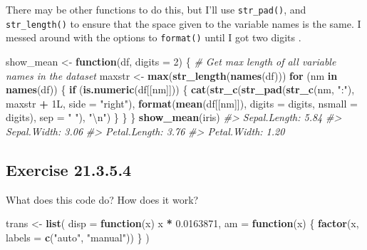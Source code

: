 \documentclass[]{book}
\newenvironment{Shaded}{\begin{snugshade}}{\end{snugshade}}
\newcommand{\CharTok}[1]{\textcolor[rgb]{0.31,0.60,0.02}{#1}}
\newcommand{\CommentTok}[1]{\textcolor[rgb]{0.56,0.35,0.01}{\textit{#1}}}
\newcommand{\ControlFlowTok}[1]{\textcolor[rgb]{0.13,0.29,0.53}{\textbf{#1}}}
\newcommand{\DataTypeTok}[1]{\textcolor[rgb]{0.13,0.29,0.53}{#1}}
\newcommand{\DecValTok}[1]{\textcolor[rgb]{0.00,0.00,0.81}{#1}}
\newcommand{\FloatTok}[1]{\textcolor[rgb]{0.00,0.00,0.81}{#1}}
\newcommand{\KeywordTok}[1]{\textcolor[rgb]{0.13,0.29,0.53}{\textbf{#1}}}
\newcommand{\NormalTok}[1]{#1}
\newcommand{\OperatorTok}[1]{\textcolor[rgb]{0.81,0.36,0.00}{\textbf{#1}}}
\newcommand{\StringTok}[1]{\textcolor[rgb]{0.31,0.60,0.02}{#1}}
\theoremstyle{plain}
\theoremstyle{remark}
\begin{document}
There may be other functions to do this, but I'll use
\texttt{str\_pad()}, and \texttt{str\_length()} to ensure that the space
given to the variable names is the same. I messed around with the
options to \texttt{format()} until I got two digits .

\begin{Shaded}
\begin{Highlighting}[]
\NormalTok{show_mean <-}\StringTok{ }\ControlFlowTok{function}\NormalTok{(df, }\DataTypeTok{digits =} \DecValTok{2}\NormalTok{) \{}
  \CommentTok{# Get max length of all variable names in the dataset}
\NormalTok{  maxstr <-}\StringTok{ }\KeywordTok{max}\NormalTok{(}\KeywordTok{str_length}\NormalTok{(}\KeywordTok{names}\NormalTok{(df)))}
  \ControlFlowTok{for}\NormalTok{ (nm }\ControlFlowTok{in} \KeywordTok{names}\NormalTok{(df)) \{}
    \ControlFlowTok{if}\NormalTok{ (}\KeywordTok{is.numeric}\NormalTok{(df[[nm]])) \{}
      \KeywordTok{cat}\NormalTok{(}\KeywordTok{str_c}\NormalTok{(}\KeywordTok{str_pad}\NormalTok{(}\KeywordTok{str_c}\NormalTok{(nm, }\StringTok{":"}\NormalTok{), maxstr }\OperatorTok{+}\StringTok{ }\NormalTok{1L, }\DataTypeTok{side =} \StringTok{"right"}\NormalTok{),}
                \KeywordTok{format}\NormalTok{(}\KeywordTok{mean}\NormalTok{(df[[nm]]), }\DataTypeTok{digits =}\NormalTok{ digits, }\DataTypeTok{nsmall =}\NormalTok{ digits),}
                \DataTypeTok{sep =} \StringTok{" "}\NormalTok{),}
          \StringTok{"}\CharTok{\textbackslash{}n}\StringTok{"}\NormalTok{)}
\NormalTok{    \}}
\NormalTok{  \}}
\NormalTok{\}}
\KeywordTok{show_mean}\NormalTok{(iris)}
\CommentTok{#> Sepal.Length: 5.84 }
\CommentTok{#> Sepal.Width:  3.06 }
\CommentTok{#> Petal.Length: 3.76 }
\CommentTok{#> Petal.Width:  1.20}
\end{Highlighting}
\end{Shaded}

\hypertarget{exercise-21.3.5.4}{%
\subsection*{\texorpdfstring{Exercise
{21.3.5.4}}{Exercise 21.3.5.4}}\label{exercise-21.3.5.4}}

What does this code do? How does it work?

\begin{Shaded}
\begin{Highlighting}[]
\NormalTok{trans <-}\StringTok{ }\KeywordTok{list}\NormalTok{(}
  \DataTypeTok{disp =} \ControlFlowTok{function}\NormalTok{(x) x }\OperatorTok{*}\StringTok{ }\FloatTok{0.0163871}\NormalTok{,}
  \DataTypeTok{am =} \ControlFlowTok{function}\NormalTok{(x) \{}
    \KeywordTok{factor}\NormalTok{(x, }\DataTypeTok{labels =} \KeywordTok{c}\NormalTok{(}\StringTok{"auto"}\NormalTok{, }\StringTok{"manual"}\NormalTok{))}
\NormalTok{  \}}
\NormalTok{)}
\end{Highlighting}
\end{Shaded}
\end{document}
